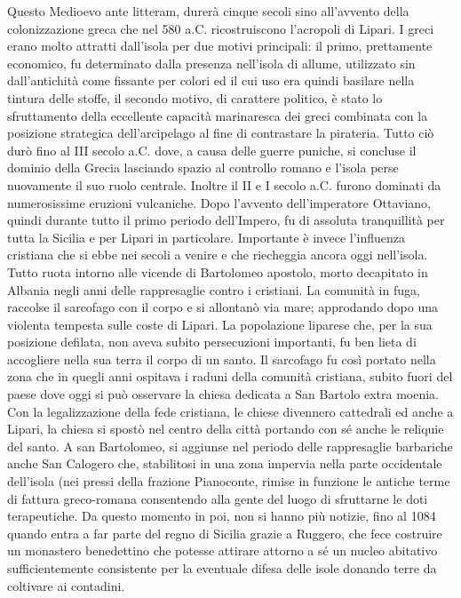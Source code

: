 \documentclass[fleqn,10pt]{SelfArx} %
\begin{document}
Questo Medioevo ante litteram, durerà cinque secoli sino all'avvento della colonizzazione greca che nel 580 a.C. ricostruiscono l'acropoli di Lipari. 
I greci erano molto attratti dall'isola per due motivi principali: il primo, prettamente economico, fu determinato dalla presenza nell'isola di allume, utilizzato sin dall'antichità come fissante per colori ed il cui uso era quindi basilare nella tintura delle stoffe, il secondo motivo, di carattere politico, è stato lo sfruttamento della eccellente capacità marinaresca dei greci combinata con la posizione strategica dell'arcipelago al fine di contrastare la pirateria. 
Tutto ciò durò fino al III secolo a.C. dove, a causa delle guerre puniche, si concluse il dominio della Grecia lasciando spazio al controllo romano e  l'isola perse nuovamente il suo ruolo centrale. Inoltre il II e I secolo a.C. furono dominati da numerosissime eruzioni vulcaniche. 
Dopo l'avvento dell'imperatore Ottaviano, quindi durante tutto il primo periodo dell'Impero, fu di assoluta tranquillità per tutta la Sicilia e per Lipari in particolare. 
Importante è invece l'influenza cristiana che si ebbe nei secoli a venire e che riecheggia ancora oggi nell'isola. Tutto ruota intorno alle vicende di Bartolomeo apostolo, morto decapitato in Albania negli anni delle rappresaglie contro i cristiani. 
La comunità in fuga, raccolse il sarcofago con il corpo e si allontanò via mare; approdando dopo una violenta tempesta sulle coste di Lipari. 
La popolazione liparese che, per la sua posizione defilata, non aveva subito persecuzioni importanti, fu ben lieta di accogliere nella sua terra il corpo di un santo. 
Il sarcofago fu così portato nella zona che in quegli anni ospitava i raduni della comunità cristiana, subito fuori del paese dove oggi si può osservare la chiesa dedicata a San Bartolo extra moenia. 
Con la legalizzazione della fede cristiana, le chiese divennero cattedrali ed anche a Lipari, la chiesa si spostò nel centro della città portando con sé anche le reliquie del santo. 
A san Bartolomeo, si aggiunse nel periodo delle rappresaglie barbariche anche San Calogero che, stabilitosi in una zona impervia nella parte occidentale dell'isola (nei pressi della frazione Pianoconte, rimise in funzione le antiche terme di fattura greco-romana consentendo alla gente del luogo di sfruttarne le doti terapeutiche. 
Da questo momento in poi, non si hanno più notizie, fino al 1084 quando entra a far parte del regno di Sicilia grazie a Ruggero, che fece costruire un monastero benedettino che potesse attirare attorno a sé un nucleo abitativo sufficientemente consistente per la eventuale difesa delle isole donando terre da coltivare ai contadini.
\end{document}

